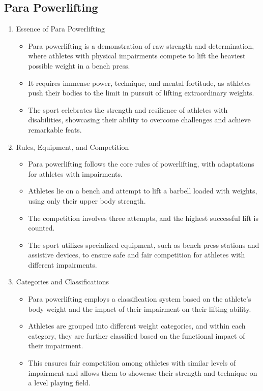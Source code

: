 \subsection{Para Powerlifting}

\begin{enumerate}

\item Essence of Para Powerlifting
    \begin{itemize}
    \item Para powerlifting is a demonstration of raw strength and determination, where athletes with physical impairments compete to lift the heaviest possible weight in a bench press. 
    \item It requires immense power, technique, and mental fortitude, as athletes push their bodies to the limit in pursuit of lifting extraordinary weights. 
    \item The sport celebrates the strength and resilience of athletes with disabilities, showcasing their ability to overcome challenges and achieve remarkable feats.
    \end{itemize}

\item Rules, Equipment, and Competition
    \begin{itemize}
    \item Para powerlifting follows the core rules of powerlifting, with adaptations for athletes with impairments. 
    \item Athletes lie on a bench and attempt to lift a barbell loaded with weights, using only their upper body strength. 
    \item The competition involves three attempts, and the highest successful lift is counted. 
    \item The sport utilizes specialized equipment, such as bench press stations and assistive devices, to ensure safe and fair competition for athletes with different impairments.
    \end{itemize}

\item Categories and Classifications
    \begin{itemize}
    \item Para powerlifting employs a classification system based on the athlete's body weight and the impact of their impairment on their lifting ability. 
    \item Athletes are grouped into different weight categories, and within each category, they are further classified based on the functional impact of their impairment. 
    \item This ensures fair competition among athletes with similar levels of impairment and allows them to showcase their strength and technique on a level playing field.
    \end{itemize}

\end{enumerate}